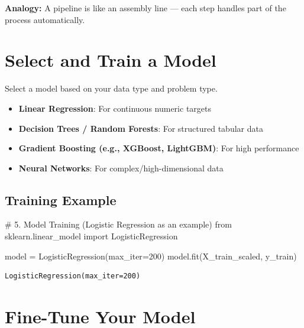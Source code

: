 \documentclass[
  letterpaper,
  DIV=11,
  numbers=noendperiod]{scrreprt}
\newenvironment{Shaded}{\begin{snugshade}}{\end{snugshade}}
\newcommand{\CommentTok}[1]{\textcolor[rgb]{0.37,0.37,0.37}{#1}}
\newcommand{\DecValTok}[1]{\textcolor[rgb]{0.68,0.00,0.00}{#1}}
\newcommand{\ImportTok}[1]{\textcolor[rgb]{0.00,0.46,0.62}{#1}}
\newcommand{\NormalTok}[1]{\textcolor[rgb]{0.00,0.23,0.31}{#1}}
\newcommand{\OperatorTok}[1]{\textcolor[rgb]{0.37,0.37,0.37}{#1}}
\providecommand{\tightlist}{%
  \setlength{\itemsep}{0pt}\setlength{\parskip}{0pt}}\usepackage{longtable,booktabs,array}
\begin{document}
\textbf{Analogy:} A pipeline is like an assembly line --- each step
handles part of the process automatically.

\section{Select and Train a Model}\label{select-and-train-a-model}

Select a model based on your data type and problem type.

\begin{itemize}
\tightlist
\item
  \textbf{Linear Regression}: For continuous numeric targets\\
\item
  \textbf{Decision Trees / Random Forests}: For structured tabular
  data\\
\item
  \textbf{Gradient Boosting (e.g., XGBoost, LightGBM)}: For high
  performance\\
\item
  \textbf{Neural Networks}: For complex/high-dimensional data
\end{itemize}

\subsection{Training Example}\label{training-example}

\begin{Shaded}
\begin{Highlighting}[]
\CommentTok{\# 5. Model Training (Logistic Regression as an example)}
\ImportTok{from}\NormalTok{ sklearn.linear\_model }\ImportTok{import}\NormalTok{ LogisticRegression}

\NormalTok{model }\OperatorTok{=}\NormalTok{ LogisticRegression(max\_iter}\OperatorTok{=}\DecValTok{200}\NormalTok{)}
\NormalTok{model.fit(X\_train\_scaled, y\_train)}
\end{Highlighting}
\end{Shaded}

\begin{verbatim}
LogisticRegression(max_iter=200)
\end{verbatim}

\section{Fine-Tune Your Model}\label{fine-tune-your-model}
\end{document}
